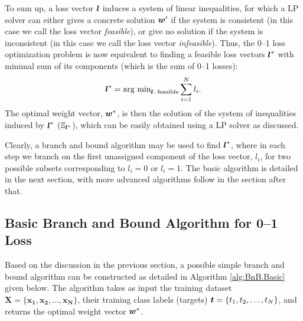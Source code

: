 To sum up, a loss vector $\boldsymbol{l}$ induces a system of linear inequalities, for which a LP solver can either gives a concrete solution $\boldsymbol{w}'$ if the system is consistent (in this case we call the loss vector \emph{feasible}), or give no solution if the system is inconsistent (in this case we call the loss vector \emph{infeasible}). Thus, the 0--1 loss optimization problem is now equivalent to finding a feasible loss vectors $\boldsymbol{l}^*$ with minimal sum of its components (which is the sum of  0--1 losses):
$$\boldsymbol{l}^* = \text{arg min}_{\boldsymbol{l} : \text{ feasible}} \sum_{i=1}^N l_i.$$
The optimal weight vector, $\boldsymbol{w}^*$, is then the solution of the system of inequalities induced by $\boldsymbol{l}^*$ ($\mathbb{S}_{\boldsymbol{l}^*}$), which can be easily obtained using a LP solver as discussed. 

Clearly, a branch and bound algorithm may be used to find $\boldsymbol{l}^*$, where in each step we branch on the first unassigned component of the loss vector, $l_i$, for two possible subsets corresponding to $l_i = 0$ or $l_i = 1$. The basic algorithm is detailed in the next section, with more advanced algorithms follow in the section after that.



\subsection{Basic Branch and Bound Algorithm for 0--1 Loss}
\label{sec:bnb.algorithm}

Based on the discussion in the previous section, a possible simple branch and bound algorithm can be constructed as detailed in Algorithm \ref{alg:BnB.Basic} given below. The algorithm takes as input the training dataset $\boldsymbol{X} =  \{ \boldsymbol{x_1, x_2, \dots, x_N } \}$, their training class labels (targets) $\boldsymbol{t} = \{ t_1, t_2, \dots, t_N \} $, and returns the optimal weight vector $\boldsymbol{w}^*$.

